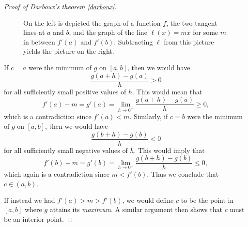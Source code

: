 \begin{proof}[Proof of Darboux's theorem \ref{darboux}]
\begin{figure}[ht]
\begin{center}
\hspace{1cm}
		\end{center}
		\caption{On the left is depicted the graph of a function $f$, the two tangent lines at $a$ and $b$, and the graph of the line $\ell(x) = mx$ for some $m$ in between $f'(a)$ and $f'(b)$. Subtracting $\ell$ from this picture yields the picture on the right.}  \label{subtracting-a-line}
	\end{figure}
	
	If $c = a$ were the minimum of $g$ on $[a,b]$, then we would have 
	\[ \frac{g(a+h)-g(a)}{h} > 0 \]
	for all sufficiently small positive values of $h$. This would mean that \[ f'(a) - m = g'(a) = \lim_{h \to 0^+} \frac{g(a+h)-g(a)}{h} \geq 0, \] which is a contradiction since $f'(a) < m$. Similarly, if $c = b$ were the minimum of $g$ on $[a,b]$, then we would have
	\[ \frac{g(b+h)-g(b)}{h} < 0 \]
	for all sufficiently small negative values of $h$. This would imply that 
	\[ f'(b) - m = g'(b) = \lim_{h \to 0^-} \frac{g(b+h)-g(b)}{h} \leq 0, \]
	which again is a contradiction since $m < f'(b)$. Thus we conclude that $c \in (a,b)$.  
	
	If instead we had $f'(a) > m > f'(b)$, we would define $c$ to be the point in $[a,b]$ where $g$ attains its \emph{maximum}. A similar argument then shows that $c$ must be an interior point. 
\end{proof}

